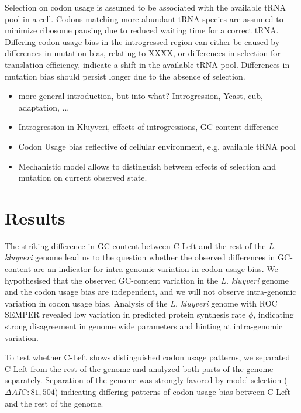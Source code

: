 \documentclass[12pt,draft]{article}
\begin{document}
Selection on codon usage is assumed to be associated with the available tRNA pool in a cell. 
Codons matching more abundant tRNA species are assumed to minimize ribosome pausing due to reduced waiting time for a correct tRNA. 
Differing codon usage bias in the introgressed region can either be caused by differences in mutation bias, relating to XXXX, or differences in selection for translation efficiency, indicate a shift in the available tRNA pool.
Differences in mutation bias should persist longer due to the absence of selection.   


\begin{itemize}
	\item more general introduction, but into what? Introgression, Yeast, cub, adaptation, ...
	\item Introgression in Kluyveri, effects of introgressions, GC-content difference
	\item Codon Usage bias reflective of cellular environment, e.g. available tRNA pool
	\item Mechanistic model allows to distinguish between effects of selection and mutation on current observed state.
\end{itemize}
	
	
\section*{Results}
The striking difference in GC-content between C-Left and the rest of the \textit{L. kluyveri} genome lead us to the question whether the observed differences in GC-content are an indicator for intra-genomic variation in codon usage bias.
We hypothesised that the observed GC-content variation in the \textit{L. kluyveri} genome and the codon usage bias are independent, and we will not observe intra-genomic variation in codon usage bias.
Analysis of the \textit{L. kluyveri} genome with ROC SEMPER revealed low variation in predicted protein synthesis rate $\phi$, indicating strong disagreement in genome wide parameters and hinting at intra-genomic variation.
  
To test whether C-Left shows distinguished codon usage patterns, we separated C-Left from the rest of the genome and analyzed both parts of the genome separately.
Separation of the genome was strongly favored by model selection ($\Delta AIC: 81,504$) indicating differing patterns of codon usage bias between C-Left and the rest of the genome.
\end{document}
